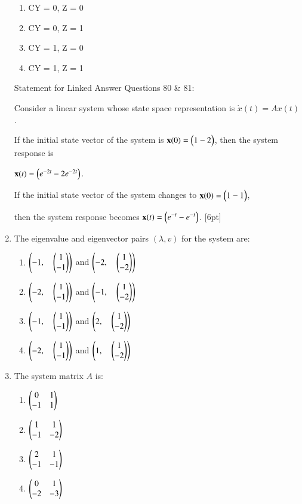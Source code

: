 \documentclass[journal,12pt,onecolumn]{IEEEtran}
\theoremstyle{remark}
\begin{document}
\begin{enumerate}
\begin{enumerate}
  \item CY = 0, Z = 0
  \item CY = 0, Z = 1
  \item CY = 1, Z = 0
  \item CY = 1, Z = 1
\end{enumerate}

Statement for Linked Answer Questions 80 \& 81:

Consider a linear system whose state space representation is $\dot{x}(t) = A x(t)$.

If the initial state vector of the system is $\mathbf{x}(0) = \begin{pmatrix}1  -2\end{pmatrix}$, then the system response is 

$\mathbf{x}(t) = \begin{pmatrix}e^{-2t}  -2e^{-2t}\end{pmatrix}$. 

If the initial state vector of the system changes to $\mathbf{x}(0) = \begin{pmatrix}1  -1\end{pmatrix}$,

then the system response becomes $\mathbf{x}(t) = \begin{pmatrix}e^{-t}  -e^{-t}\end{pmatrix}$. [6pt]

\item The eigenvalue and eigenvector pairs $(\lambda, v)$ for the system are:  
\hfill{}

\begin{enumerate}
  \item $\left(-1,\quad \begin{pmatrix}1 \\ -1\end{pmatrix}\right)$ \quad and \quad $\left(-2,\quad \begin{pmatrix}1 \\ -2\end{pmatrix}\right)$
  \item $\left(-2,\quad \begin{pmatrix}1 \\ -1\end{pmatrix}\right)$ \quad and \quad $\left(-1,\quad \begin{pmatrix}1 \\ -2\end{pmatrix}\right)$
  \item $\left(-1,\quad \begin{pmatrix}1 \\ -1\end{pmatrix}\right)$ \quad and \quad $\left(2,\quad \begin{pmatrix}1 \\ -2\end{pmatrix}\right)$
  \item $\left(-2,\quad \begin{pmatrix}1 \\ -1\end{pmatrix}\right)$ \quad and \quad $\left(1,\quad \begin{pmatrix}1 \\ -2\end{pmatrix}\right)$
\end{enumerate}
 
\item The system matrix $A$ is:  
\hfill{}
\begin{multicols}{4}
\begin{enumerate}
  \item $\begin{pmatrix}0 & 1 \\ -1 & 1\end{pmatrix}$
  \item $\begin{pmatrix}1 & 1 \\ -1 & -2\end{pmatrix}$
  \item $\begin{pmatrix}2 & 1 \\ -1 & -1\end{pmatrix}$
  \item $\begin{pmatrix}0 & 1 \\ -2 & -3\end{pmatrix}$
\end{enumerate}
\end{multicols}


\end{enumerate}
\end{document}
